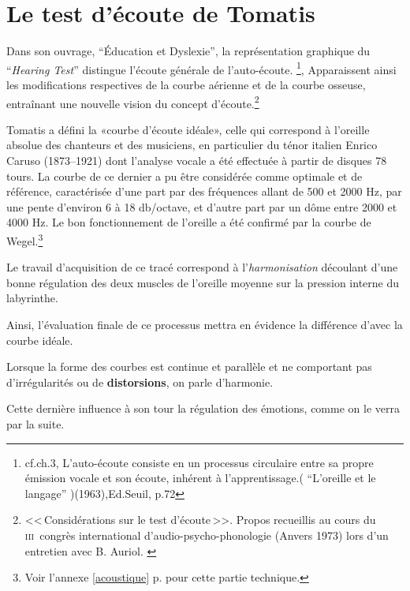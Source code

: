 
\section{Le test d'écoute de Tomatis}


Dans son ouvrage, ``Éducation et
    Dyslexie'',\autocite{tomatis:education} la représentation graphique du 
 ``\emph{Hearing Test}'' distingue l'écoute générale de
 l'auto-écoute. \footnote{cf.ch.3, L'auto-écoute consiste en un processus
   circulaire entre sa propre  émission vocale et son écoute, inhérent
   à l'apprentissage.( ``L'oreille et le langage'' )(1963),Ed.Seuil,
   p.72}, 
 Apparaissent ainsi les modifications respectives
 de la courbe aérienne et de la courbe osseuse, entraînant une nouvelle vision
 du concept d'écoute.\footnote{<<\,Considérations sur le test d'écoute\,>>. Propos
  	recueillis au cours du \textsc{iii}\ieme\ congrès international
  	d'audio-psycho-phonologie (Anvers 1973) lors d'un entretien
        avec B. Auriol. \autocite{auriol_stress}}





Tomatis a défini la «courbe d'écoute idéale», celle qui correspond à l'oreille absolue
des chanteurs et des musiciens, en particulier du ténor italien Enrico
Caruso (1873--1921) dont l'analyse vocale a été effectuée à partir de
disques 78 tours. La courbe de ce dernier a pu être considérée comme
optimale et de référence, caractérisée d'une part par des fréquences allant de 500 et 2000
Hz, par une pente d\textquoteright environ 6 à 18 db/octave,
et d'autre part par un dôme entre 2000 et 4000 Hz.
Le bon fonctionnement de l'oreille a été confirmé par la courbe
de Wegel.\footnote{
		Voir l'annexe \ref{acoustique} p. \pageref{acoustique}
		 pour cette partie technique.}
               

Le travail d'acquisition de ce tracé correspond à l'\textsl{harmonisation}
découlant d'une bonne régulation des deux muscles de l'oreille moyenne
sur la pression interne du
labyrinthe.

Ainsi, l'évaluation finale de ce processus mettra en évidence la différence
d'avec la courbe idéale.

Lorsque la forme des 
courbes est continue et parallèle et ne comportant pas d'irrégularités ou
de \textbf{distorsions},
on parle d'harmonie.

Cette dernière influence à son tour 
la régulation des émotions, comme on le verra par la suite.



